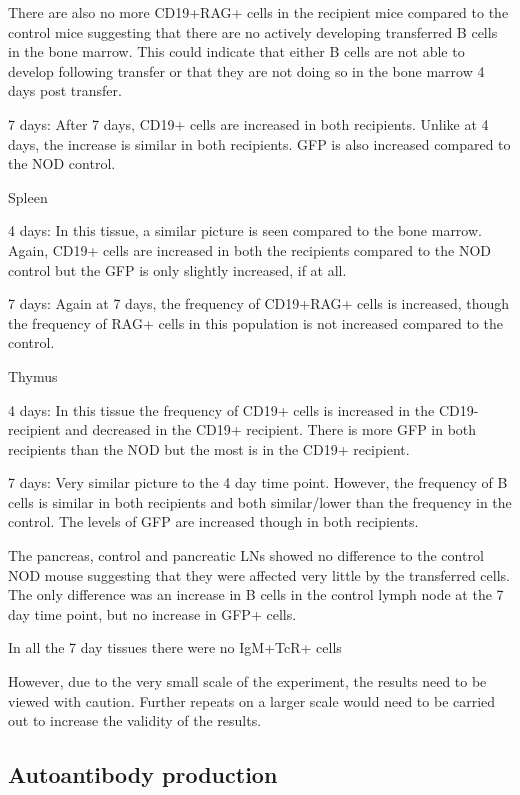 There are also no more CD19+RAG+ cells in the recipient mice compared to the control mice suggesting that there are no actively developing transferred B cells in the bone marrow.
This could indicate that either B cells are not able to develop following transfer or that they are not doing so in the bone marrow 4 days post transfer.

7 days:
After 7 days, CD19+ cells are increased in both recipients. 
Unlike at 4 days, the increase is similar in both recipients.
GFP is also increased compared to the NOD control.

Spleen

4 days:
In this tissue, a similar picture is seen compared to the bone marrow. 
Again, CD19+ cells are increased in both the recipients compared to the NOD control but the GFP is only slightly increased, if at all.

7 days:
Again at 7 days, the frequency of CD19+RAG+ cells is increased, though the frequency of RAG+ cells in this population is not increased compared to the control.


Thymus

4 days:
In this tissue the frequency of CD19+ cells is increased in the CD19- recipient and decreased in the CD19+ recipient.
There is more GFP in both recipients than the NOD but the most is in the CD19+ recipient.

7 days:
Very similar picture to the 4 day time point.
However, the frequency of B cells is similar in both recipients and both similar/lower than the frequency in the control.
The levels of GFP are increased though in both recipients.


The pancreas, control and pancreatic LNs showed no difference to the control NOD mouse suggesting that they were affected very little by the transferred cells. 
The only difference was an increase in B cells in the control lymph node at the 7 day time point, but no increase in GFP+ cells.

In all the 7 day tissues there were no IgM+TcR+ cells



However, due to the very small scale of the experiment, the results need to be viewed with caution.
Further repeats on a larger scale would need to be carried out to increase the validity of the results.

\subsection{Autoantibody production}


